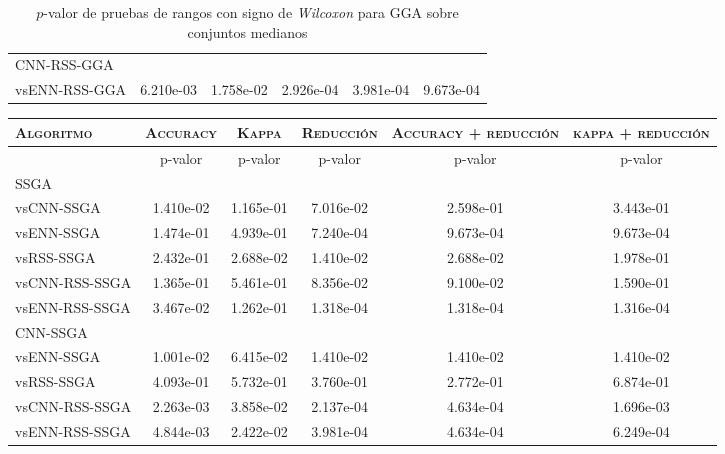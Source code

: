\begin{table}[h!]
\begin{adjustbox}{max width =\textwidth}
\begin{tabular}{l c c c c c}
\hline

CNN-RSS-GGA\\
vsENN-RSS-GGA & 6.210e-03 & 1.758e-02 & 2.926e-04 & 3.981e-04 & 9.673e-04 \\

\hline

\end{tabular}
\end{adjustbox}
\caption[Pruebas de \emph{Wilcoxon} entre GGA y variaciones para conjuntos medianos]{$p$-valor de pruebas de rangos con signo de \emph{Wilcoxon} para GGA sobre conjuntos medianos}
\label{wilcox-gga-med}
\end{table}

\begin{table}[h!]
\centering
\begin{adjustbox}{max width =\textwidth}
\begin{tabular}{l c c c c c}
\hline
	\textsc{Algoritmo}
	& \multicolumn{1}{c}{\textsc{Accuracy}}
	& \multicolumn{1}{c}{\textsc{Kappa}}
	& \multicolumn{1}{c}{\textsc{Reducción}} 
	& \multicolumn{1}{c}{\textsc{Accuracy + reducción}} 
	& \multicolumn{1}{c}{\textsc{kappa + reducción}} \\
\hline
\hline

 & p-valor & p-valor & p-valor & p-valor & p-valor \\

SSGA\\
vsCNN-SSGA & 1.410e-02 & 1.165e-01 & 7.016e-02 & 2.598e-01 & 3.443e-01 \\    
vsENN-SSGA & 1.474e-01 & 4.939e-01 & 7.240e-04 & 9.673e-04 & 9.673e-04 \\ 
vsRSS-SSGA  & 2.432e-01 & 2.688e-02 & 1.410e-02 & 2.688e-02 & 1.978e-01 \\    
vsCNN-RSS-SSGA & 1.365e-01 & 5.461e-01 & 8.356e-02 & 9.100e-02 & 1.590e-01 \\ 
vsENN-RSS-SSGA & 3.467e-02 & 1.262e-01 & 1.318e-04 & 1.318e-04 & 1.316e-04 \\ 

\hline

CNN-SSGA\\
vsENN-SSGA & 1.001e-02 & 6.415e-02 & 1.410e-02 & 1.410e-02 & 1.410e-02 \\
vsRSS-SSGA & 4.093e-01 & 5.732e-01 & 3.760e-01 & 2.772e-01 & 6.874e-01 \\
vsCNN-RSS-SSGA & 2.263e-03 & 3.858e-02 & 2.137e-04 & 4.634e-04 & 1.696e-03 \\
vsENN-RSS-SSGA & 4.844e-03 & 2.422e-02 & 3.981e-04 & 4.634e-04 & 6.249e-04 \\


\end{tabular}
\end{adjustbox}
\end{table}
